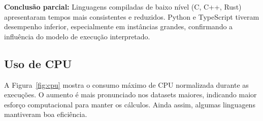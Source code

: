 \documentclass[12pt, a4paper]{article}
\begin{document}
\begin{table}[H]
    \centering
    \caption{Tempo médio de execução (em segundos) e desvio-padrão por linguagem e tamanho do dataset (geral, sem NP-Completo).}
    \label{tab:tempo_execucao_geral_sem_npcomp}
\end{table}

\textbf{Conclusão parcial:} Linguagens compiladas de baixo nível (C, C++, Rust) apresentaram tempos mais consistentes e reduzidos. Python e TypeScript tiveram desempenho inferior, especialmente em instâncias grandes, confirmando a influência do modelo de execução interpretado.

\subsection{Uso de CPU}

A Figura~\ref{fig:cpu} mostra o consumo máximo de CPU normalizada durante as execuções. O aumento é mais pronunciado nos datasets maiores, indicando maior esforço computacional para manter os cálculos. Ainda assim, algumas linguagens mantiveram boa eficiência.
\end{document}

